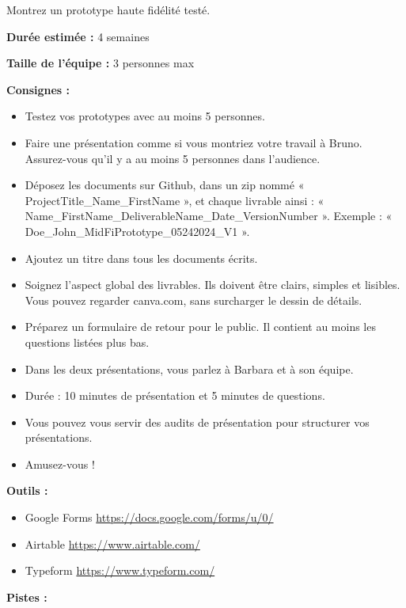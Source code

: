\makeheaderfiles

Montrez un prototype haute fidélité testé.

\textbf{Durée estimée :} 4 semaines

\textbf{Taille de l'équipe :} 3 personnes max

\textbf{Consignes :}

\begin{itemize}
\item Testez vos prototypes avec au moins 5 personnes.
\item Faire une présentation comme si vous montriez votre travail à Bruno. Assurez-vous qu'il y a au moins 5 personnes dans l'audience.
\item Déposez les documents sur Github, dans un zip nommé « ProjectTitle\_Name\_FirstName », et chaque livrable ainsi : « Name\_FirstName\_DeliverableName\_Date\_VersionNumber ». Exemple : « Doe\_John\_MidFiPrototype\_05242024\_V1 ».
\item Ajoutez un titre dans tous les documents écrits.
\item Soignez l'aspect global des livrables. Ils doivent être clairs, simples et lisibles. Vous pouvez regarder canva.com, sans surcharger le dessin de détails.
\item Préparez un formulaire de retour pour le public. Il contient au moins les questions listées plus bas.
\item Dans les deux présentations, vous parlez à Barbara et à son équipe.
\item Durée : 10 minutes de présentation et 5 minutes de questions.
\item Vous pouvez vous servir des audits de présentation pour structurer vos présentations.
\item Amusez-vous !
\end{itemize}

\textbf{Outils :}

\begin{itemize}
\item Google Forms \url{https://docs.google.com/forms/u/0/}
\item Airtable \url{https://www.airtable.com/}
\item Typeform \url{https://www.typeform.com/}
\end{itemize}

\textbf{Pistes :}

